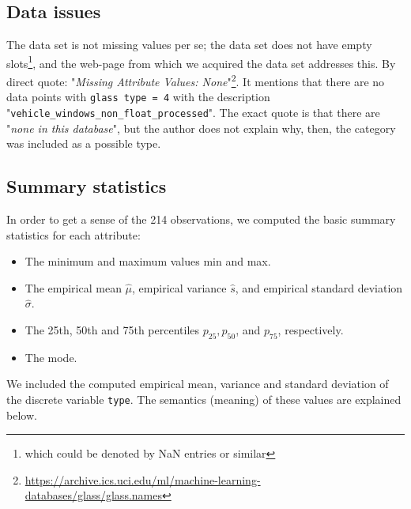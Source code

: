 \subsection{Data issues}\label{sec:data_issues}
The data set is not missing values per se; the data set does not have empty slots\footnote{which could be denoted by NaN entries or similar}, and the web-page from which we acquired the data set addresses this. By direct quote: "\textit{Missing Attribute Values: None}"\footnote{\url{https://archive.ics.uci.edu/ml/machine-learning-databases/glass/glass.names}}. 
It mentions that there are no data points with \texttt{glass type = 4} with the description "\texttt{vehicle\_windows\_non\_float\_processed}". The exact quote is that there are "\textit{none in this database}", but the author does not explain why, then, the category was included as a possible type.

\subsection{Summary statistics}

In order to get a sense of the 214 observations, we computed the basic summary statistics for each attribute:

\begin{itemize}
\setlength\itemsep{- 0.5 em}
\item The minimum and maximum values min and max.
\item The empirical mean $\hat{\mu}$, empirical variance $\hat{s}$, and empirical standard deviation  $\hat{\sigma}$.
\item The 25th, 50th and 75th percentiles $p_{25}, p_{50}$, and $p_{75}$, respectively.
\item The mode.
\end{itemize}

We included the computed empirical mean, variance and standard deviation of the discrete variable \texttt{type}. The semantics (meaning) of these values are explained below.

\setlength\extrarowheight{4pt}

